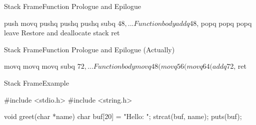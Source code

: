 \begin{slide}{Stack Frame}{Function Prologue and Epilogue}
  \begin{nicscolumn}
    \begin{nicsextern}[height=6cm]{}
      push   %
      movq   %
      pushq  %
      pushq  %
      pushq  %
      subq   $48, %

      ...                  Function body

      addq   $48, %
      popq   %
      popq   %
      popq   %
      leave                Restore %
                           and deallocate stack
      ret
    \end{nicsextern}
  \end{nicscolumn}
\end{slide}

\begin{slide}{Stack Frame}{Function Prologue and Epilogue (Actually)}
  \begin{nicscolumn}
    \begin{nicsextern}[height=6cm]{}
      movq   %
      movq   %
      movq   %
      subq   $72, %

      ...                     Function body

      movq   48(%
      movq   56(%
      movq   64(%
      addq   $72, %
      ret
    \end{nicsextern}
  \end{nicscolumn}
\end{slide}

\begin{slide}{Stack Frame}{Example}
  \begin{nicscolumn}
    \begin{nicsextern}[height=5cm]{}
      #include <stdio.h>
      #include <string.h>

      void greet(char *name) {
        char buf[20] = "Hello: ";
        strcat(buf, name);
        puts(buf);
      }
    \end{nicsextern}
  \end{nicscolumn}
\end{slide}

